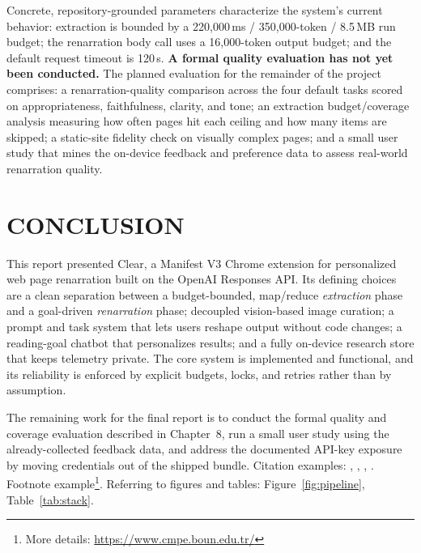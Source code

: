 \documentclass[a4paper,12pt]{report}
\begin{document}
Concrete, repository-grounded parameters characterize the system's current
behavior: extraction is bounded by a 220{,}000\,ms / 350{,}000-token / 8.5\,MB
run budget; the renarration body call uses a 16{,}000-token output budget; and the
default request timeout is 120\,s. \textbf{A formal quality evaluation has not yet
been conducted.} The planned evaluation for the remainder of the project
comprises: a renarration-quality comparison across the four default tasks scored
on appropriateness, faithfulness, clarity, and tone; an extraction
budget/coverage analysis measuring how often pages hit each ceiling and how many
items are skipped; a static-site fidelity check on visually complex pages; and a
small user study that mines the on-device feedback and preference data to assess
real-world renarration quality.

\chapter{CONCLUSION}
This report presented Clear, a Manifest V3 Chrome extension for personalized web
page renarration built on the OpenAI Responses API. Its defining choices are a
clean separation between a budget-bounded, map/reduce \emph{extraction} phase and
a goal-driven \emph{renarration} phase; decoupled vision-based image curation; a
prompt and task system that lets users reshape output without code changes; a
reading-goal chatbot that personalizes results; and a fully on-device research
store that keeps telemetry private. The core system is implemented and functional,
and its reliability is enforced by explicit budgets, locks, and retries rather
than by assumption.

The remaining work for the final report is to conduct the formal quality and
coverage evaluation described in Chapter~8, run a small user study using the
already-collected feedback data, and address the documented API-key exposure by
moving credentials out of the shipped bundle. Citation examples:
\cite{kintsch}, \cite{openai}, \cite{mv3}, \cite{mapreduce}. Footnote
example\footnote{More details: {\url{https://www.cmpe.boun.edu.tr/}}}. Referring
to figures and tables: Figure~\ref{fig:pipeline}, Table~\ref{tab:stack}.
\end{document}
